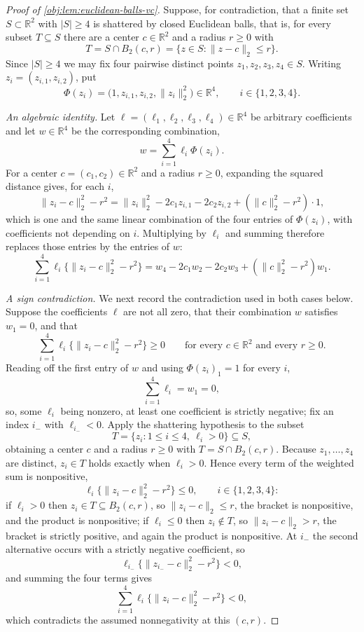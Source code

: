 \documentclass[11pt]{article}
\begin{document}
\begin{proof}[Proof of \cref{obj:lem:euclidean-balls-vc}]
Suppose, for contradiction, that a finite set \(S\subset\mathbb R^2\) with \(|S|\ge4\) is
shattered by closed Euclidean balls, that is, for every subset \(T\subseteq S\) there are a
center \(c\in\mathbb R^2\) and a radius \(r\ge0\) with
\[
T=S\cap B_2(c,r)=\{z\in S:\|z-c\|_2\leq r\} .
\]
Since \(|S|\ge4\) we may fix four pairwise distinct points \(z_1,z_2,z_3,z_4\in S\).
Writing \(z_i=(z_{i,1},z_{i,2})\), put
\[
\Phi(z_i)=\bigl(1,z_{i,1},z_{i,2},\|z_i\|_2^2\bigr)\in\mathbb R^4 ,
\qquad i\in\{1,2,3,4\} .
\]

\emph{An algebraic identity.}  Let \(\ell=(\ell_1,\ell_2,\ell_3,\ell_4)\in\mathbb R^4\) be
arbitrary coefficients and let \(w\in\mathbb R^4\) be the corresponding combination,
\[
w=\sum_{i=1}^4\ell_i\Phi(z_i) .
\]
For a center \(c=(c_1,c_2)\in\mathbb R^2\) and a radius \(r\ge0\), expanding the squared
distance gives, for each \(i\),
\[
\|z_i-c\|_2^2-r^2
=
\|z_i\|_2^2-2c_1z_{i,1}-2c_2z_{i,2}+(\|c\|_2^2-r^2)\cdot 1 ,
\]
which is one and the same linear combination of the four entries of \(\Phi(z_i)\), with
coefficients not depending on \(i\).  Multiplying by \(\ell_i\) and summing therefore
replaces those entries by the entries of \(w\):
\[
\sum_{i=1}^4\ell_i\{\|z_i-c\|_2^2-r^2\}
=
w_4-2c_1w_2-2c_2w_3+(\|c\|_2^2-r^2)w_1 .
\]

\emph{A sign contradiction.}  We next record the contradiction used in both cases below.
Suppose the coefficients \(\ell\) are not all zero, that their combination \(w\) satisfies
\(w_1=0\), and that
\[
\sum_{i=1}^4\ell_i\{\|z_i-c\|_2^2-r^2\}\ge 0
\qquad\text{for every }c\in\mathbb R^2\text{ and every }r\ge0 .
\]
Reading off the first entry of \(w\) and using \(\Phi(z_i)_1=1\) for every \(i\),
\[
\sum_{i=1}^4\ell_i=w_1=0 ,
\]
so, some \(\ell_i\) being nonzero, at least one coefficient is strictly negative; fix an
index \(i_-\) with \(\ell_{i_-}<0\).
Apply the shattering hypothesis to the subset
\[
T=\{z_i:1\le i\le 4,\ \ell_i>0\}\subseteq S ,
\]
obtaining a center \(c\) and a radius \(r\ge0\) with \(T=S\cap B_2(c,r)\).  Because
\(z_1,\ldots,z_4\) are distinct, \(z_i\in T\) holds exactly when \(\ell_i>0\).  Hence every
term of the weighted sum is nonpositive,
\[
\ell_i\{\|z_i-c\|_2^2-r^2\}\le0 ,\qquad i\in\{1,2,3,4\} :
\]
if \(\ell_i>0\) then \(z_i\in T\subseteq B_2(c,r)\), so \(\|z_i-c\|_2\le r\), the bracket
is nonpositive, and the product is nonpositive; if \(\ell_i\le0\) then \(z_i\notin T\), so
\(\|z_i-c\|_2>r\), the bracket is strictly positive, and again the product is nonpositive.
At \(i_-\) the second alternative occurs with a strictly negative coefficient, so
\[
\ell_{i_-}\{\|z_{i_-}-c\|_2^2-r^2\}<0 ,
\]
and summing the four terms gives
\[
\sum_{i=1}^4\ell_i\{\|z_i-c\|_2^2-r^2\}<0 ,
\]
which contradicts the assumed nonnegativity at this \((c,r)\).


\end{proof}
\end{document}
